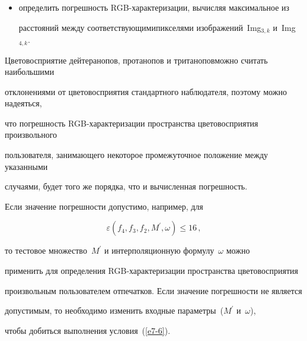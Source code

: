 \begin{itemize}
значениями


$$


(R^\prime,G^\prime,B^\prime)=\Psi ((R,G,B),f_4,f_3,f_2,M^\prime ,\omega,\varphi_k)\,,


$$


вычисленными по интерполяционной формуле~$\omega$;


\item  определить погрешность RGB-характеризации, вычисляя максимальное из


расстояний между соответствующими\linebreak пикселями изображений~Img$_{3,k}$ и~Img$_{4,k}$.


\end{itemize}





Цветовосприятие дейтеранопов, протанопов и тританопов\linebreak мож\-но считать наибольшими


отклонениями от цветовосприятия стандартного наблюдателя, поэтому можно надеяться,


что погрешность RGB-характеризации пространства цветовосприятия произвольного


пользователя, занимающего некоторое промежуточное положение между указанными


случаями, будет того же порядка, что и вычисленная погрешность.





Если значение погрешности допустимо, например, для


\begin{equation}


\varepsilon (f_4,f_3,f_2,M^\prime ,\omega)\leq 16\,,


\label{e7-6}


\end{equation}


то тестовое множество~$M^\prime$ и интерполяционную формулу~$\omega$ мож\-но


применить для определения RGB-характеризации пространства цветовосприятия


произвольным пользователем отпечатков. Если значение погрешности не является


допустимым, то необходимо изменить входные параметры~($M^\prime$ и~$\omega$),


чтобы добиться выполнения условия~(\ref{e7-6}).





